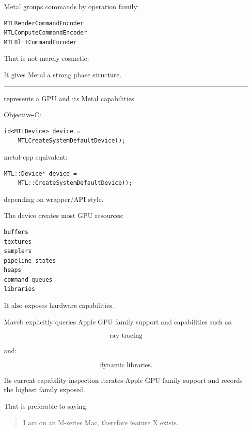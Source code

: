 Metal groups commands by operation family:

\begin{verbatim}
MTLRenderCommandEncoder
MTLComputeCommandEncoder
MTLBlitCommandEncoder
\end{verbatim}

That is not merely cosmetic.

It gives Metal a strong phase structure.

\begin{center}\rule{0.5\linewidth}{0.5pt}\end{center}

\textbf{}

 represents a GPU and its Metal capabilities.

Objective-C:

\begin{verbatim}
id<MTLDevice> device =
    MTLCreateSystemDefaultDevice();
\end{verbatim}

metal-cpp equivalent:

\begin{verbatim}
MTL::Device* device =
    MTL::CreateSystemDefaultDevice();
\end{verbatim}

depending on wrapper/API style.

The device creates most GPU resources:

\begin{verbatim}
buffers
textures
samplers
pipeline states
heaps
command queues
libraries
\end{verbatim}

It also exposes hardware capabilities.

Maveb explicitly queries Apple GPU family support and capabilities such as:

\[
\text{ray tracing}
\]

and:

\[
\text{dynamic libraries}.
\]

Its current capability inspection iterates Apple GPU family support and records the highest family exposed.

That is preferable to saying:

\begin{quote}
I am on an M-series Mac, therefore feature X exists.
\end{quote}

